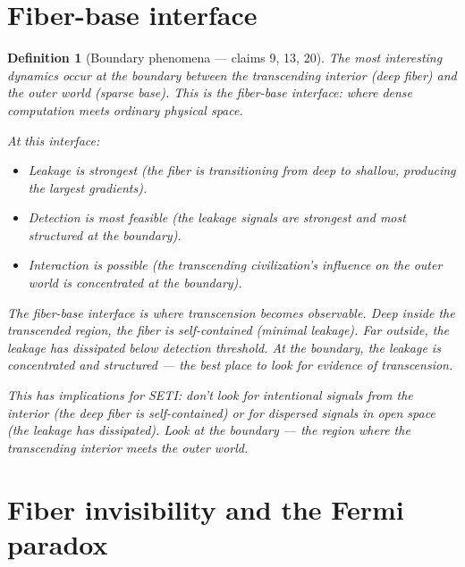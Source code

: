 \documentclass[11pt,a4paper]{article}
\newtheorem{definition}{Definition}[section]
\begin{document}
\section{Fiber-base interface}
\label{sec:interface}

\begin{definition}[Boundary phenomena --- claims 9, 13, 20]
\label{def:interface}
The most interesting dynamics occur at the boundary between the
transcending interior (deep fiber) and the outer world (sparse base).
This is the \emph{fiber-base interface}: where dense computation meets
ordinary physical space.

At this interface:
\begin{itemize}
\item Leakage is strongest (the fiber is transitioning from deep to
  shallow, producing the largest gradients).
\item Detection is most feasible (the leakage signals are strongest
  and most structured at the boundary).
\item Interaction is possible (the transcending civilization's
  influence on the outer world is concentrated at the boundary).
\end{itemize}

The fiber-base interface is where transcension becomes observable.
Deep inside the transcended region, the fiber is self-contained
(minimal leakage). Far outside, the leakage has dissipated below
detection threshold. At the boundary, the leakage is concentrated
and structured --- the best place to look for evidence of
transcension.

This has implications for SETI: don't look for intentional signals
from the interior (the deep fiber is self-contained) or for
dispersed signals in open space (the leakage has dissipated). Look
at the boundary --- the region where the transcending interior
meets the outer world.
\end{definition}

\section{Fiber invisibility and the Fermi paradox}
\label{sec:fermi}
\end{document}
